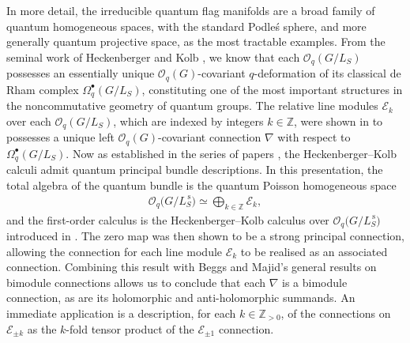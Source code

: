 \documentclass[pdftex]{sigma}
\numberwithin{equation}{section}
\begin{document}
In more detail, the irreducible quantum flag manifolds are a broad family of quantum homogeneous spaces, with the standard Podle\'s sphere, and more generally quantum projective space, as the most tractable examples. From the seminal work of Heckenberger and Kolb \cite{HK,HKdR}, we know that each $\mathcal{O}_q(G/L_S)$ possesses an essentially unique $\mathcal{O}_q(G)$-covariant \mbox{$q$-deformation} of its classical de Rham complex $\Omega^{\bullet}_q(G/L_S)$, constituting one of the most important structures in the noncommutative geometry of quantum groups. The relative line modules $\mathcal{E}_k$ over each $\mathcal{O}_q(G/L_S)$, which are indexed by integers $k \in \mathbb{Z}$, were shown in \cite{HVBQFM} to possesses a unique left $\mathcal{O}_q(G)$-covariant connection $\nabla$ with respect to $\Omega^{\bullet}_q(G/L_S)$. Now as established in the series of papers \cite{CDOBBW,BwGrass,GAPP}, the Heckenberger--Kolb calculi admit quantum principal bundle descriptions. In this presentation, the total algebra of the quantum bundle is the quantum Poisson homogeneous space
\begin{gather*}
\mathcal{O}_q\big(G/L^{\,\mathrm{s}}_S\big) \simeq \bigoplus_{k \in \mathbb{Z}} \mathcal{E}_k,
\end{gather*}
and the first-order calculus is the Heckenberger--Kolb calculus over $\mathcal{O}_q\big(G/L^{\,\mathrm{s}}_S\big)$ introduced in \cite[Section~3.2.3]{HKdR}. The zero map was then shown to be a strong principal connection, allowing the connection for each line module $\mathcal{E}_k$ to be realised as an associated connection. Combining this result with Beggs and Majid's general results on bimodule connections allows us to conclude that each $\nabla$ is a bimodule connection, as are its holomorphic and anti-holomorphic summands. An immediate application is a description, for each $k \in \mathbb{Z}_{>0}$, of the connections on $\mathcal{E}_{\pm k}$ as the $k$-fold tensor product of the $\mathcal{E}_{\pm 1}$ connection.
\end{document}
